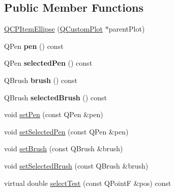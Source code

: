 \subsection*{Public Member Functions}
\begin{DoxyCompactItemize}
\item 
\hyperlink{classQCPItemEllipse_a759b77ef002515eba0263b5447ecb3fb}{Q\-C\-P\-Item\-Ellipse} (\hyperlink{classQCustomPlot}{Q\-Custom\-Plot} $\ast$parent\-Plot)
\item 
\hypertarget{classQCPItemEllipse_adb67471eabaf1214c99767f1653ca0ed}{Q\-Pen {\bfseries pen} () const }\label{classQCPItemEllipse_adb67471eabaf1214c99767f1653ca0ed}

\item 
\hypertarget{classQCPItemEllipse_ac52ab52225d238365ff3264b4b69130f}{Q\-Pen {\bfseries selected\-Pen} () const }\label{classQCPItemEllipse_ac52ab52225d238365ff3264b4b69130f}

\item 
\hypertarget{classQCPItemEllipse_ac012e4fd59fdb1afb6554937bae8f7e1}{Q\-Brush {\bfseries brush} () const }\label{classQCPItemEllipse_ac012e4fd59fdb1afb6554937bae8f7e1}

\item 
\hypertarget{classQCPItemEllipse_a0043e401a912d54ea3195bab0967b394}{Q\-Brush {\bfseries selected\-Brush} () const }\label{classQCPItemEllipse_a0043e401a912d54ea3195bab0967b394}

\item 
void \hyperlink{classQCPItemEllipse_adb81a663ed2420fcfa011e49f678d1a6}{set\-Pen} (const Q\-Pen \&pen)
\item 
void \hyperlink{classQCPItemEllipse_a6c542fba1dc918041c583f58a50dde99}{set\-Selected\-Pen} (const Q\-Pen \&pen)
\item 
void \hyperlink{classQCPItemEllipse_a49fc74e6965834e873d027d026def798}{set\-Brush} (const Q\-Brush \&brush)
\item 
void \hyperlink{classQCPItemEllipse_a9693501cfaa43a099655c75bed0dab3f}{set\-Selected\-Brush} (const Q\-Brush \&brush)
\item 
virtual double \hyperlink{classQCPItemEllipse_ac456143773711ea2e3782e51ff2f7eb4}{select\-Test} (const Q\-Point\-F \&pos) const 
\end{DoxyCompactItemize}
